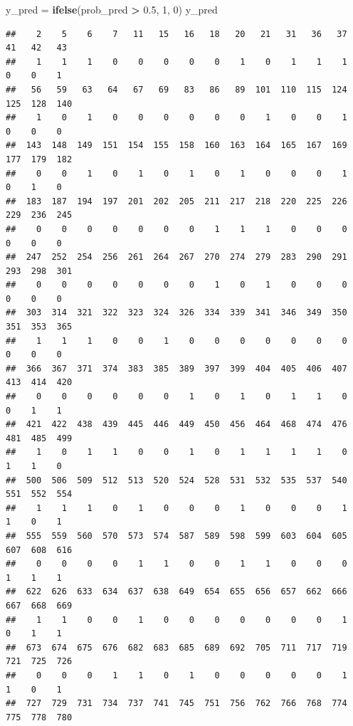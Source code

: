 \documentclass[
]{article}
\newenvironment{Shaded}{\begin{snugshade}}{\end{snugshade}}
\newcommand{\DecValTok}[1]{\textcolor[rgb]{0.00,0.00,0.81}{#1}}
\newcommand{\FloatTok}[1]{\textcolor[rgb]{0.00,0.00,0.81}{#1}}
\newcommand{\KeywordTok}[1]{\textcolor[rgb]{0.13,0.29,0.53}{\textbf{#1}}}
\newcommand{\NormalTok}[1]{#1}
\newcommand{\OperatorTok}[1]{\textcolor[rgb]{0.81,0.36,0.00}{\textbf{#1}}}
\newcommand{\StringTok}[1]{\textcolor[rgb]{0.31,0.60,0.02}{#1}}
\begin{document}
\begin{Shaded}
\begin{Highlighting}[]
\NormalTok{y_pred =}\StringTok{ }\KeywordTok{ifelse}\NormalTok{(prob_pred }\OperatorTok{>}\StringTok{ }\FloatTok{0.5}\NormalTok{, }\DecValTok{1}\NormalTok{, }\DecValTok{0}\NormalTok{)}
\NormalTok{y_pred}
\end{Highlighting}
\end{Shaded}

\begin{verbatim}
##    2    5    6    7   11   15   16   18   20   21   31   36   37   41   42   43 
##    1    1    1    0    0    0    0    0    1    0    1    1    1    0    0    1 
##   56   59   63   64   67   69   83   86   89  101  110  115  124  125  128  140 
##    1    0    1    0    0    0    0    0    0    1    0    0    1    0    0    0 
##  143  148  149  151  154  155  158  160  163  164  165  167  169  177  179  182 
##    0    0    1    0    1    0    1    0    1    0    0    0    1    0    1    0 
##  183  187  194  197  201  202  205  211  217  218  220  225  226  229  236  245 
##    0    0    0    0    0    0    0    1    1    1    0    0    0    0    0    0 
##  247  252  254  256  261  264  267  270  274  279  283  290  291  293  298  301 
##    0    0    0    0    0    0    0    1    0    1    0    0    0    0    0    0 
##  303  314  321  322  323  324  326  334  339  341  346  349  350  351  353  365 
##    1    1    1    0    0    1    0    0    0    0    0    0    0    0    0    0 
##  366  367  371  374  383  385  389  397  399  404  405  406  407  413  414  420 
##    0    0    0    0    0    0    1    0    1    0    1    1    0    0    1    1 
##  421  422  438  439  445  446  449  450  456  464  468  474  476  481  485  499 
##    1    0    1    1    0    0    1    0    1    1    1    1    0    1    1    0 
##  500  506  509  512  513  520  524  528  531  532  535  537  540  551  552  554 
##    1    1    1    0    1    0    0    0    1    0    0    0    1    1    0    1 
##  555  559  560  570  573  574  587  589  598  599  603  604  605  607  608  616 
##    0    0    0    0    1    1    0    0    1    1    0    0    0    1    1    1 
##  622  626  633  634  637  638  649  654  655  656  657  662  666  667  668  669 
##    1    1    0    0    1    0    0    0    0    0    0    0    1    0    1    1 
##  673  674  675  676  682  683  685  689  692  705  711  717  719  721  725  726 
##    0    0    0    1    1    0    1    0    0    0    0    0    1    1    0    1 
##  727  729  731  734  737  741  745  751  756  762  766  768  774  775  778  780 

\end{verbatim}
\end{document}

